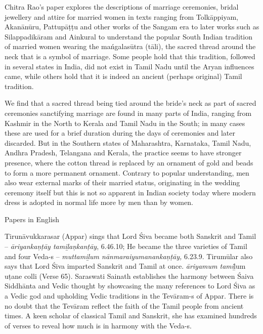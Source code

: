 Chitra Rao’s paper explores the descriptions of marriage ceremonies, bridal jewellery and attire for married women in texts ranging from Tolkāppiyam, Akanānūru, Pattupāṭṭu and other works of the Sangam era to later works such as Silappadikāram and Ainkural to understand the popular South Indian tradition of married women wearing the mańgalasūtra (tāli), the sacred thread around the neck that is a symbol of marriage. Some people hold that this tradition, followed in several states in India, did not exist in Tamil Nadu until the Aryan influences came, while others hold that it is indeed an ancient (perhaps original) Tamil tradition.

We find that a sacred thread being tied around the bride's neck as part of sacred ceremonies sanctifying marriage are found in many parts of India, ranging from Kashmir in the North to Kerala and Tamil Nadu in the South; in many cases these are used for a brief duration during the days of ceremonies and later discarded. But in the Southern states of Maharashtra, Karnataka, Tamil Nadu, Andhra Pradesh, Telangana and Kerala, the practice seems to have stronger presence, where the cotton thread is replaced by an ornament of gold and beads to form a more permanent ornament. Contrary to popular understanding, men also wear external marks of their married status, originating in the wedding ceremony itself but this is not so apparent in Indian society today where modern dress is adopted in normal life more by men than by women.

Papers in English

Tirunāvukkarasar (Appar) sings that Lord Śiva became both Sanskrit and Tamil – \textit{āriyankaņṭāy tamiḻaņkanṭāy}, 6.46.10; He became the three varieties of Tamil and four Veda-s -- \textit{muttamiḻum nānmaraiyumanankaņ\break ṭāy,} 6.23.9. Tirumūlar also says that Lord Śiva imparted Sanskrit and Tamil at once. \textit{āriyamum tami}ḻum uṭane colli (Verse 65). Saraswati Sainath establishes the harmony between Śaiva Siddhānta and Vedic thought by showcasing the many references to Lord Śiva as a Vedic god and upholding Vedic traditions in the Tevāram-s of Appar. There is no doubt that the Tevāram reflect the faith of the Tamil people from ancient times. A keen scholar of classical Tamil and Sanskrit, she has examined hundreds of verses to reveal how much is in harmony with the Veda-s.

